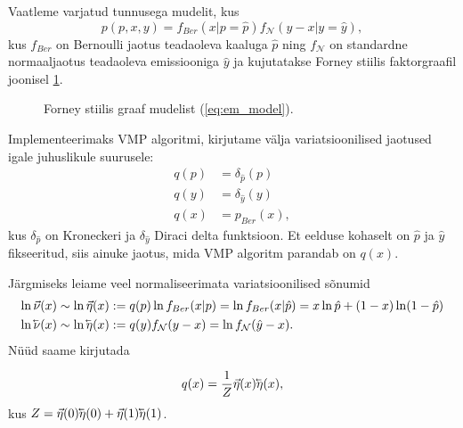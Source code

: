 Vaatleme varjatud tunnusega mudelit, kus 
\begin{equation}
    \label{eq:em_model}
     p(p,x,y) = f_{Ber}(x | p = \hat{p}) f_{\mathcal{N}}(y-x|y=\hat{y}),
\end{equation}
kus $f_{Ber}$ on Bernoulli jaotus teadaoleva kaaluga $\hat{p}$ ning $f_{\mathcal{N}}$ on standardne normaaljaotus teadaoleva emissiooniga $\hat{y}$ ja kujutatakse Forney stiilis faktorgraafil \parencite{COX2019185} joonisel \ref{fig:em_model}.

\begin{figure}[!ht]
\centering
{}%
\caption{Forney stiilis graaf mudelist (\ref{eq:em_model}).}
\label{fig:em_model}
\end{figure}

Implementeerimaks VMP algoritmi, kirjutame välja variatsioonilised jaotused igale juhuslikule suurusele:
\begin{align*}
    q(p) &= \delta_{\hat{p}}(p)\\
    q(y) &= \delta_{\hat{y}}(y)\\
    q(x) &= p_{Ber}(x),
\end{align*}
kus $\delta_{\hat{p}}$ on Kroneckeri ja $\delta_{\hat{y}}$ Diraci delta funktsioon. Et eelduse kohaselt on $\hat{p}$ ja $\hat{y}$ fikseeritud, siis ainuke jaotus, mida VMP algoritm parandab on $q(x)$. 

Järgmiseks leiame veel normaliseerimata variatsioonilised sõnumid
\begin{align*}
    \ln \vec{\nu}(x) &\sim \ln \vec{\eta}(x) := q(p)\ln f_{Ber}(x | p) = \ln f_{Ber}(x | \hat{p}) = x \ln \hat{p} + (1-x) \ln (1-\hat{p})\\
    \ln \cev{\nu}(x) &\sim \ln \cev{\eta}(x) := q(y)f_{\mathcal{N}}(y - x) = \ln f_{\mathcal{N}}(\hat{y} - x).
\end{align*}
Nüüd saame kirjutada

$$q(x) = \frac{1}{Z} \vec{\eta}(x) \cev{\eta}(x),$$
kus $Z = \vec{\eta}(0) \cev{\eta}(0) + \vec{\eta}(1) \cev{\eta}(1)$. 

